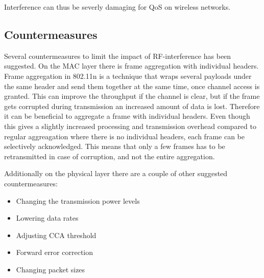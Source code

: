 	Interference can thus be severly damaging for QoS on wireless networks.   %

	\subsection{Countermeasures}
	Several countermeasures to limit the impact of RF-interference has been suggested.
	On the MAC layer there is frame aggregation with individual headers.
	Frame aggregation in 802.11n is a technique that wraps several payloads under the same
	header and send them together at the same time, once channel access is granted. This can improve the throughput
	if the channel is clear, but if the frame gets corrupted during transmission
	an increased amount of data is lost.
	Therefore it can be beneficial to aggregate a frame with individual headers.
	Even though this gives a slightly increased processing and transmission overhead
	compared to regular aggreagation where there is no individual headers, 
	each frame can be selectively acknowledged.
	This means that only a few frames has to be retransmitted in case of corruption,
	and not the entire aggregation. 

	Additionally on the physical layer there are a couple of other suggested countermeasures:
	\begin{itemize}
	\item Changing the transmission power levels
	\item Lowering data rates
	\item Adjusting CCA threshold
	\item Forward error correction
	\item Changing packet sizes
	\end{itemize}


